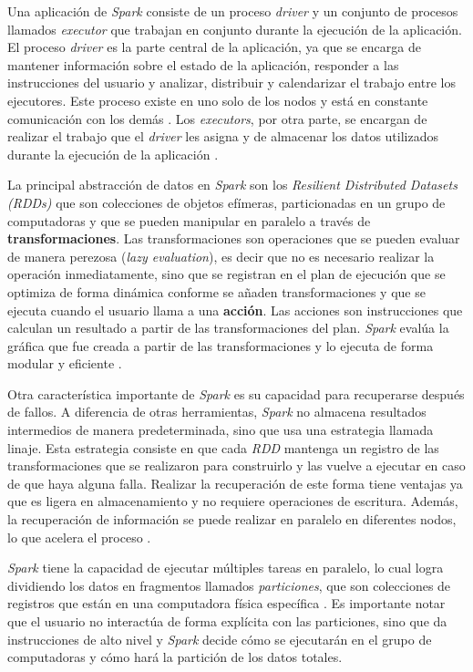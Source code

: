 Una aplicación de \textit{Spark} consiste de un proceso \textit{driver} y un conjunto de procesos llamados \textit{executor} que trabajan en conjunto durante la ejecución de la aplicación. El proceso \textit{driver} es la parte central de la aplicación, ya que se encarga de mantener información sobre el estado de la aplicación, responder a las instrucciones del usuario y analizar, distribuir y calendarizar el trabajo entre los ejecutores. Este proceso existe en uno solo de los nodos y está en constante comunicación con los demás \cite{sparkguide}. Los \textit{executors}, por otra parte, se encargan de realizar el trabajo que el \textit{driver} les asigna y de almacenar los datos utilizados durante la ejecución de la aplicación \cite{sparkclusteroverview}.

La principal abstracción de datos en \textit{Spark} son los \textit{Resilient Distributed Datasets (RDDs)} que son colecciones de objetos efímeras, particionadas en un grupo de computadoras y que se pueden manipular en paralelo a través de \textbf{transformaciones}. Las transformaciones son operaciones que se pueden evaluar de manera perezosa (\textit{lazy evaluation}), es decir que no es necesario realizar la operación inmediatamente, sino que se registran en el plan de ejecución que se optimiza de forma dinámica conforme se añaden transformaciones y que se ejecuta cuando el usuario llama a una \textbf{acción}. Las acciones son instrucciones que calculan un resultado a partir de las transformaciones del plan. \textit{Spark} evalúa la gráfica que fue creada a partir de las transformaciones y lo ejecuta de forma modular y eficiente \cite{sparkberkeley}.

Otra característica importante de \textit{Spark} es su capacidad para recuperarse después de fallos. A diferencia de otras herramientas, \textit{Spark} no almacena resultados intermedios de manera predeterminada, sino que usa una estrategia llamada linaje. Esta estrategia consiste en que cada \textit{RDD} mantenga un registro de las transformaciones que se realizaron para construirlo y las vuelve a ejecutar en caso de que haya alguna falla. Realizar la recuperación de este forma tiene ventajas ya que es ligera en almacenamiento y no requiere operaciones de escritura. Además, la recuperación de información se puede realizar en paralelo en diferentes nodos, lo que acelera el proceso \cite{sparkberkeley}.

\textit{Spark} tiene la capacidad de ejecutar múltiples tareas en paralelo, lo cual logra dividiendo los datos en fragmentos llamados \textit{particiones}, que son colecciones de registros que están en una computadora física específica \cite{sparkguide}. Es importante notar que el usuario no interactúa de forma explícita con las particiones, sino que da instrucciones de alto nivel y \textit{Spark} decide cómo se ejecutarán en el grupo de computadoras y cómo hará la partición de los datos totales.

